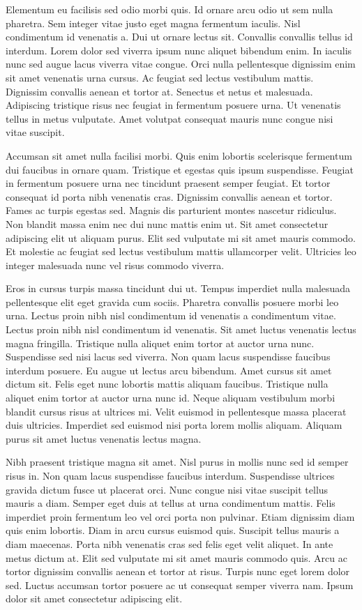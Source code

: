 \documentclass[11pt,a4paper]{article}
\begin{document}
Elementum eu facilisis sed odio morbi quis. Id ornare arcu odio ut sem nulla pharetra. Sem integer vitae justo eget magna fermentum iaculis. Nisl condimentum id venenatis a. Dui ut ornare lectus sit. Convallis convallis tellus id interdum. Lorem dolor sed viverra ipsum nunc aliquet bibendum enim. In iaculis nunc sed augue lacus viverra vitae congue. Orci nulla pellentesque dignissim enim sit amet venenatis urna cursus. Ac feugiat sed lectus vestibulum mattis. Dignissim convallis aenean et tortor at. Senectus et netus et malesuada. Adipiscing tristique risus nec feugiat in fermentum posuere urna. Ut venenatis tellus in metus vulputate. Amet volutpat consequat mauris nunc congue nisi vitae suscipit.

Accumsan sit amet nulla facilisi morbi. Quis enim lobortis scelerisque fermentum dui faucibus in ornare quam. Tristique et egestas quis ipsum suspendisse. Feugiat in fermentum posuere urna nec tincidunt praesent semper feugiat. Et tortor consequat id porta nibh venenatis cras. Dignissim convallis aenean et tortor. Fames ac turpis egestas sed. Magnis dis parturient montes nascetur ridiculus. Non blandit massa enim nec dui nunc mattis enim ut. Sit amet consectetur adipiscing elit ut aliquam purus. Elit sed vulputate mi sit amet mauris commodo. Et molestie ac feugiat sed lectus vestibulum mattis ullamcorper velit. Ultricies leo integer malesuada nunc vel risus commodo viverra.

Eros in cursus turpis massa tincidunt dui ut. Tempus imperdiet nulla malesuada pellentesque elit eget gravida cum sociis. Pharetra convallis posuere morbi leo urna. Lectus proin nibh nisl condimentum id venenatis a condimentum vitae. Lectus proin nibh nisl condimentum id venenatis. Sit amet luctus venenatis lectus magna fringilla. Tristique nulla aliquet enim tortor at auctor urna nunc. Suspendisse sed nisi lacus sed viverra. Non quam lacus suspendisse faucibus interdum posuere. Eu augue ut lectus arcu bibendum. Amet cursus sit amet dictum sit. Felis eget nunc lobortis mattis aliquam faucibus. Tristique nulla aliquet enim tortor at auctor urna nunc id. Neque aliquam vestibulum morbi blandit cursus risus at ultrices mi. Velit euismod in pellentesque massa placerat duis ultricies. Imperdiet sed euismod nisi porta lorem mollis aliquam. Aliquam purus sit amet luctus venenatis lectus magna.

Nibh praesent tristique magna sit amet. Nisl purus in mollis nunc sed id semper risus in. Non quam lacus suspendisse faucibus interdum. Suspendisse ultrices gravida dictum fusce ut placerat orci. Nunc congue nisi vitae suscipit tellus mauris a diam. Semper eget duis at tellus at urna condimentum mattis. Felis imperdiet proin fermentum leo vel orci porta non pulvinar. Etiam dignissim diam quis enim lobortis. Diam in arcu cursus euismod quis. Suscipit tellus mauris a diam maecenas. Porta nibh venenatis cras sed felis eget velit aliquet. In ante metus dictum at. Elit sed vulputate mi sit amet mauris commodo quis. Arcu ac tortor dignissim convallis aenean et tortor at risus. Turpis nunc eget lorem dolor sed. Luctus accumsan tortor posuere ac ut consequat semper viverra nam. Ipsum dolor sit amet consectetur adipiscing elit.
\end{document}
